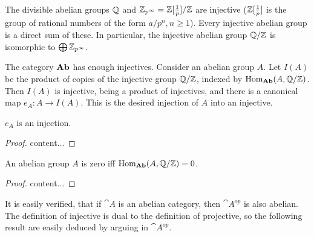 \begin{example}
	The divisible abelian groups ${\mathbb Q}$ and ${\mathbb Z}_{p^\infty}={\mathbb Z}[\frac{1}{p}]/{\mathbb Z}$ are injective (${\mathbb Z}[\frac{1}{p}]$ is the group of rational numbers of the form $a/p^n,n\geq 1$). Every injective abelian group is a direct sum of these. In particular, the injective abelian group ${\mathbb Q}/{\mathbb Z}$ is isomorphic to $\bigoplus{\mathbb Z}_{p^\infty}$.
\end{example}

The category $\textrm{\textup{\textbf{Ab}}}$ has enough injectives.
Consider an abelian group $A$. Let $I(A)$ be the product of copies of the injective group ${\mathbb Q}/{\mathbb Z}$, indexed by $\operatorname{Hom}_{\textrm{\textup{\textbf{Ab}}}}(A,{\mathbb Q}/{\mathbb Z})$.
Then $I(A)$ is injective, being a product of injectives, and there is a canonical map $e_A:A\rightarrow I(A)$.
This is the desired injection of $A$ into an injective.

\begin{exercise}
	$e_A$ is an injection.
\end{exercise}

\begin{proof}
	content...
\end{proof}

\begin{exercise}
	An abelian group $A$ is zero iff $\operatorname{Hom}_{\textrm{\textup{\textbf{Ab}}}}(A,{\mathbb Q}/{\mathbb Z})=0$.
\end{exercise}

\begin{proof}
	content...
\end{proof}

\begin{remark}
	It is easily verified, that if $\cat{A}$ is an abelian category, then $\cat{A}^{op}$ is also abelian.
	The definition of injective is dual to the definition of projective, so the following result are easily deduced by arguing in $\cat{A}^{op}$.
\end{remark}

